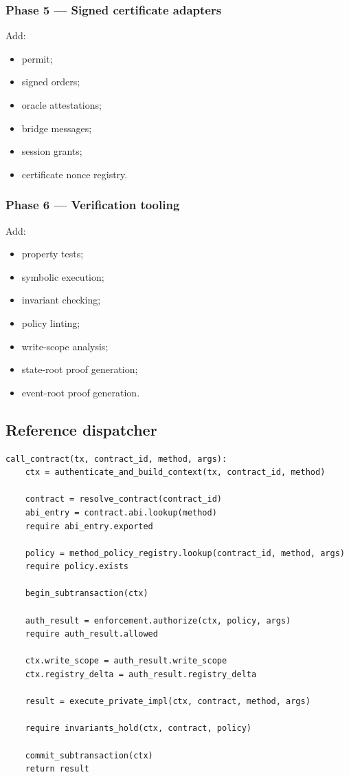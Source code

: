 \documentclass[11pt]{article}
\begin{document}
\subsubsection{Phase 5 --- Signed certificate adapters}

Add:

\begin{itemize}
  \item permit;
  \item signed orders;
  \item oracle attestations;
  \item bridge messages;
  \item session grants;
  \item certificate nonce registry.
\end{itemize}

\subsubsection{Phase 6 --- Verification tooling}

Add:

\begin{itemize}
  \item property tests;
  \item symbolic execution;
  \item invariant checking;
  \item policy linting;
  \item write-scope analysis;
  \item state-root proof generation;
  \item event-root proof generation.
\end{itemize}

\subsection{Reference dispatcher}

\begin{lstlisting}
call_contract(tx, contract_id, method, args):
    ctx = authenticate_and_build_context(tx, contract_id, method)

    contract = resolve_contract(contract_id)
    abi_entry = contract.abi.lookup(method)
    require abi_entry.exported

    policy = method_policy_registry.lookup(contract_id, method, args)
    require policy.exists

    begin_subtransaction(ctx)

    auth_result = enforcement.authorize(ctx, policy, args)
    require auth_result.allowed

    ctx.write_scope = auth_result.write_scope
    ctx.registry_delta = auth_result.registry_delta

    result = execute_private_impl(ctx, contract, method, args)

    require invariants_hold(ctx, contract, policy)

    commit_subtransaction(ctx)
    return result
\end{lstlisting}
\end{document}
